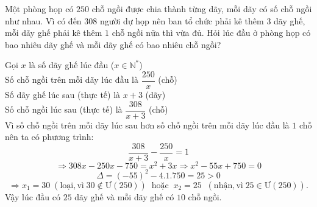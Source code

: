 \begin{ex}%
Một phòng họp có $250$ chỗ ngồi được chia thành từng dãy, mỗi dãy có số chỗ ngồi như nhau. Vì có đến $308$ người dự họp nên ban tổ chức phải kê thêm $3$ dãy ghế, mỗi dãy ghế phải kê thêm $1$ chỗ ngồi nữa thì vừa đủ. Hỏi lúc đầu ở phòng họp có bao nhiêu dãy ghế và mỗi dãy ghế có bao nhiêu chỗ ngồi?

\loigiai
    {
Gọi $x$ là số dãy ghế lúc đầu ($x \in \mathbb{N}^*$)\\
Số chỗ ngồi trên mỗi dãy lúc đầu là $\dfrac{250}{x}$ (chỗ)\\
Số dãy ghế lúc sau (thực tế) là $x+3$ (dãy)\\
Số chỗ ngồi lúc sau (thực tế) là $\dfrac{308}{x+3}$ (chỗ)\\
Vì số chỗ ngồi trên mỗi dãy lúc sau hơn số chỗ ngồi trên mỗi dãy lúc đầu là $1$ chỗ nên ta có phương trình:
$$ \dfrac{308}{x+3}-\dfrac{250}{x}=1 $$
$$ \Rightarrow 308x-250x-750=x^2+3x \Rightarrow x^2-55x+750=0$$
$$ \Delta =\left(-55\right)^2-4.1.750=25>0 $$
$$ \Rightarrow x_1=30 \; (\text{loại}, \text{vì} \;30 \notin \text{Ư}(250) ) \;\;\text{hoặc}\;\; x_2=25\; \; (\text{nhận}, \text{vì} \;25\in \text{Ư}(250) ).$$
Vậy lúc đầu có $25$ dãy ghế và mỗi dãy ghế có $10$ chỗ ngồi.
	}
\end{ex}
